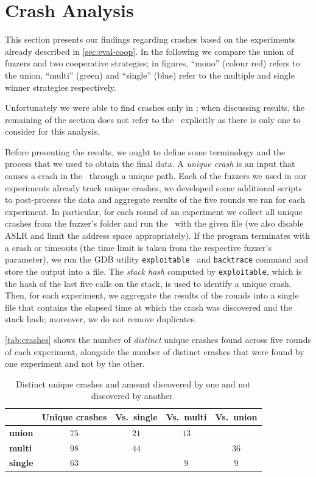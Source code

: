 \section{Crash Analysis}
\label{sec:eval-crashes}

This section presents our findings regarding crashes based on the experiments
already described in \autoref{sec:eval-coop}. In the following we compare the
union of fuzzers and two cooperative strategies; in figures, ``mono'' (colour
red) refers to the union, ``multi'' (green) and ``single'' (blue) refer to the
multiple and single winner strategies respectively.

Unfortunately we were able to find crashes only in \listswf; when discussing
results, the remaining of the section does not refer to the \sut\ explicitly as
there is only one to consider for this analysis.

Before presenting the results, we ought to define some terminology and the
process that we used to obtain the final data. A \emph{unique crash} is an input
that causes a crash in the \sut\ through a unique path. Each of the fuzzers we
used in our experiments already track unique crashes, we developed some
additional scripts to post-process the data and aggregate results of the five
rounds we ran for each experiment. In particular, for each round of an
experiment we collect all unique crashes from the fuzzer's folder and run the
\sut\ with the given file (we also disable \ac{ASLR} and limit the address space
appropriately). If the program terminates with a crash or timeouts (the time
limit is taken from the respective fuzzer's parameter), we run the GDB utility
\texttt{exploitable}~\cite{foote2013cert} and \texttt{backtrace} command and
store the output into a file. The \emph{stack hash} computed by
\texttt{exploitable}, which is the hash of the last five calls on the stack, is
used to identify a unique crash. Then, for each experiment, we aggregate the
results of the rounds into a single file that contains the elapsed time at which
the crash was discovered and the stack hash; moreover, we do not remove
duplicates.

\autoref{tab:crashes} shows the number of \emph{distinct} unique crashes found
across five rounds of each experiment, alongside the number of distinct crashes
that were found by one experiment and not by the other.

\begin{table}[h]
    \centering%
    \begin{tabular}{l c c c c}
        & \textbf{Unique crashes} & \textbf{Vs.\ single} &
            \textbf{Vs.\ multi} & \textbf{Vs.\ union} \\
        \bottomrule%
        \textbf{union} & $75$ & $21$ & $13$ & \\
        \hline%
        \textbf{multi} & $98$ & $44$ & & $36$ \\
        \hline%
        \textbf{single} & $63$ & & $9$ & $9$
    \end{tabular}
    \caption{Distinct unique crashes and amount discovered by one and not
    discovered by another.}
    \label{tab:crashes}
\end{table}

